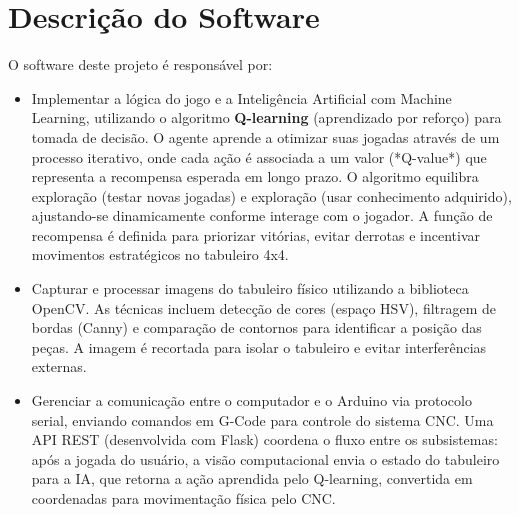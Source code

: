 \documentclass[a4paper,12pt]{article}
\begin{document}
\section{Descrição do Software}
O software deste projeto é responsável por:
\begin{itemize}
    \item Implementar a lógica do jogo e a Inteligência Artificial com Machine Learning, utilizando o algoritmo \textbf{Q-learning} (aprendizado por reforço) para tomada de decisão. O agente aprende a otimizar suas jogadas através de um processo iterativo, onde cada ação é associada a um valor (*Q-value*) que representa a recompensa esperada em longo prazo. O algoritmo equilibra exploração (testar novas jogadas) e exploração (usar conhecimento adquirido), ajustando-se dinamicamente conforme interage com o jogador. A função de recompensa é definida para priorizar vitórias, evitar derrotas e incentivar movimentos estratégicos no tabuleiro 4x4.
    
    \item Capturar e processar imagens do tabuleiro físico utilizando a biblioteca OpenCV. As técnicas incluem detecção de cores (espaço HSV), filtragem de bordas (Canny) e comparação de contornos para identificar a posição das peças. A imagem é recortada para isolar o tabuleiro e evitar interferências externas.
    
    \item Gerenciar a comunicação entre o computador e o Arduino via protocolo serial, enviando comandos em G-Code para controle do sistema CNC. Uma API REST (desenvolvida com Flask) coordena o fluxo entre os subsistemas: após a jogada do usuário, a visão computacional envia o estado do tabuleiro para a IA, que retorna a ação aprendida pelo Q-learning, convertida em coordenadas para movimentação física pelo CNC.
\end{itemize}
\end{document}
